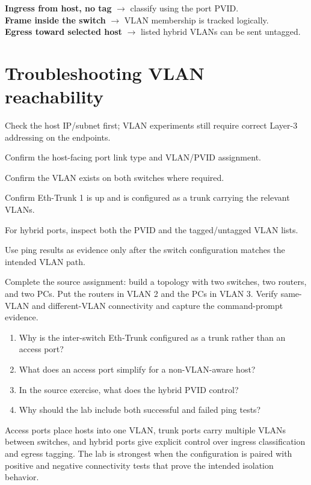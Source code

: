 \begin{conceptmap}
\textbf{Ingress from host, no tag} $\rightarrow$ classify using the port PVID.\\
\textbf{Frame inside the switch} $\rightarrow$ VLAN membership is tracked logically.\\
\textbf{Egress toward selected host} $\rightarrow$ listed hybrid VLANs can be sent untagged.
\end{conceptmap}

\section{Troubleshooting VLAN reachability}
\begin{netsteps}
\item Check the host IP/subnet first; VLAN experiments still require correct Layer-3 addressing on the endpoints.
\item Confirm the host-facing port link type and VLAN/PVID assignment.
\item Confirm the VLAN exists on both switches where required.
\item Confirm Eth-Trunk 1 is up and is configured as a trunk carrying the relevant VLANs.
\item For hybrid ports, inspect both the PVID and the tagged/untagged VLAN lists.
\item Use ping results as evidence only after the switch configuration matches the intended VLAN path.
\end{netsteps}

\begin{tryit}
Complete the source assignment: build a topology with two switches, two routers, and two PCs. Put the routers in VLAN 2 and the PCs in VLAN 3. Verify same-VLAN and different-VLAN connectivity and capture the command-prompt evidence.
\end{tryit}

\begin{quickcheck}
\begin{enumerate}
\item Why is the inter-switch Eth-Trunk configured as a trunk rather than an access port?
\item What does an access port simplify for a non-VLAN-aware host?
\item In the source exercise, what does the hybrid PVID control?
\item Why should the lab include both successful and failed ping tests?
\end{enumerate}
\end{quickcheck}

\begin{chapterrecap}
Access ports place hosts into one VLAN, trunk ports carry multiple VLANs between switches, and hybrid ports give explicit control over ingress classification and egress tagging. The lab is strongest when the configuration is paired with positive and negative connectivity tests that prove the intended isolation behavior.
\end{chapterrecap}
